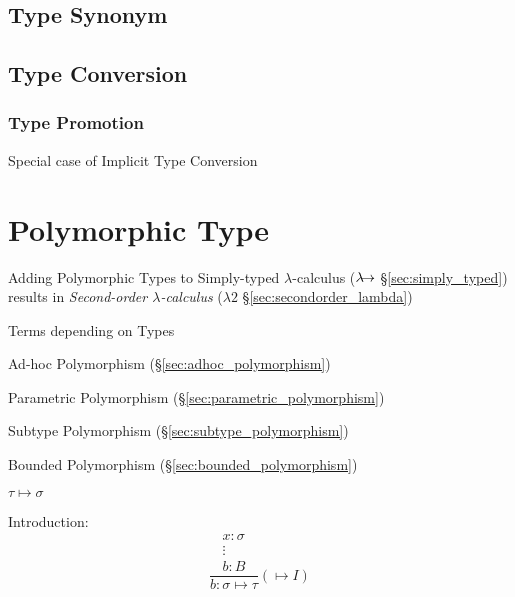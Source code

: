 \subsection{Type Synonym}\label{sec:type_synonym}

\subsection{Type Conversion}\label{sec:type_conversion}

\subsubsection{Type Promotion}\label{sec:type_promotion}

Special case of Implicit Type Conversion



\section{Polymorphic Type}\label{sec:polymorphic_type}

Adding Polymorphic Types to Simply-typed $\lambda$-calculus
($\lambda\kern-5pt\rightarrow$ \S\ref{sec:simply_typed}) results in
\emph{Second-order $\lambda$-calculus} ($\lambda2$
\S\ref{sec:secondorder_lambda})

Terms depending on Types


Ad-hoc Polymorphism (\S\ref{sec:adhoc_polymorphism})

Parametric Polymorphism (\S\ref{sec:parametric_polymorphism})

Subtype Polymorphism (\S\ref{sec:subtype_polymorphism})

Bounded Polymorphism (\S\ref{sec:bounded_polymorphism})


\asterism


$\tau \mapsto \sigma$

Introduction:
\[
  {
  \frac{
    \begin{matrix}
      x : \sigma \\
      \vdots \\
      b : B
    \end{matrix}
  }
  {b : \sigma \mapsto \tau}
  }(\mapsto I)
\]


